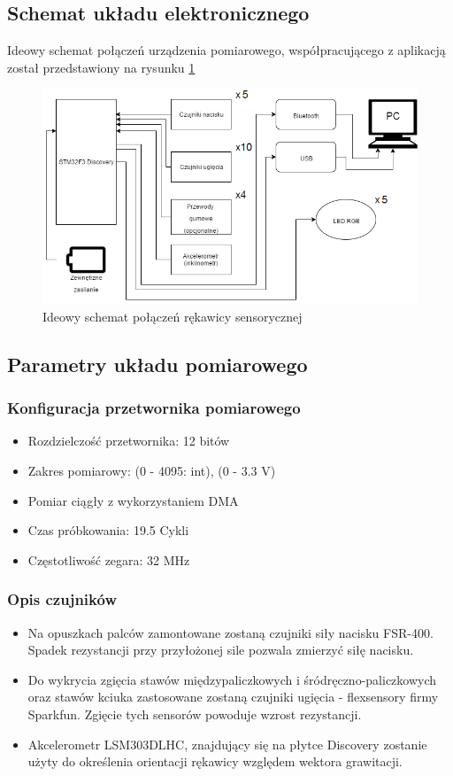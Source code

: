 \documentclass[12pt,a4paper]{article}
\begin{document}
\subsection{Schemat układu elektronicznego}
Ideowy schemat połączeń urządzenia pomiarowego, współpracującego z aplikacją został przedstawiony na rysunku \ref{fig:ideascheme}
\begin{figure}[!htb]
\centering
\includegraphics[width=\textwidth]{./SchematIdeowy.png}
\caption{Ideowy schemat połączeń rękawicy sensorycznej\label{fig:ideascheme}}
\end{figure}

\subsection{Parametry układu pomiarowego}
\subsubsection{Konfiguracja przetwornika pomiarowego}
\begin{itemize}
\item Rozdzielczość przetwornika: 12 bitów
\item Zakres pomiarowy: (0 - 4095: int), (0 - 3.3 V)
\item Pomiar ciągły z wykorzystaniem DMA
\item Czas próbkowania: 19.5 Cykli
\item Częstotliwość zegara: 32 MHz
\end{itemize}

\newpage
\subsubsection{Opis czujników}
\begin{itemize}
\item Na opuszkach palców zamontowane zostaną czujniki siły nacisku FSR-400. Spadek rezystancji przy przyłożonej sile pozwala zmierzyć siłę nacisku.
\item Do wykrycia zgięcia stawów międzypaliczkowych i śródręczno-paliczkowych oraz stawów kciuka zastosowane zostaną czujniki ugięcia - flexsensory firmy Sparkfun. Zgięcie tych sensorów powoduje wzrost rezystancji.
\item Akcelerometr LSM303DLHC, znajdujący się na płytce Discovery zostanie użyty do określenia orientacji rękawicy względem wektora grawitacji.
\end{itemize}
\end{document}
